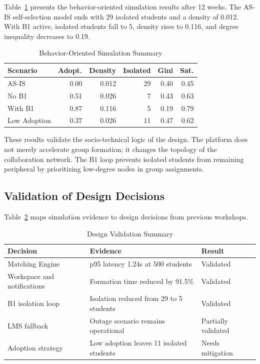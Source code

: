 \documentclass[conference]{IEEEtran}
\begin{document}
Table~\ref{tab:behavior} presents the behavior-oriented simulation results after 12 weeks. The AS-IS self-selection model ends with 29 isolated students and a density of 0.012. With B1 active, isolated students fall to 5, density rises to 0.116, and degree inequality decreases to 0.19.

\begin{table}[htbp]
\caption{Behavior-Oriented Simulation Summary}
\label{tab:behavior}
\centering
\begin{tabular}{lrrrrr}
\toprule
\textbf{Scenario} & \textbf{Adopt.} & \textbf{Density} & \textbf{Isolated} & \textbf{Gini} & \textbf{Sat.} \\
\midrule
AS-IS & 0.00 & 0.012 & 29 & 0.40 & 0.45 \\
No B1 & 0.51 & 0.026 & 7 & 0.43 & 0.63 \\
With B1 & 0.87 & 0.116 & 5 & 0.19 & 0.79 \\
Low Adoption & 0.37 & 0.026 & 11 & 0.47 & 0.62 \\
\bottomrule
\end{tabular}
\end{table}

These results validate the socio-technical logic of the design. The platform does not merely accelerate group formation; it changes the topology of the collaboration network. The B1 loop prevents isolated students from remaining peripheral by prioritizing low-degree nodes in group assignments.

\subsection{Validation of Design Decisions}

Table~\ref{tab:validation} maps simulation evidence to design decisions from previous workshops.

\begin{table}[htbp]
\caption{Design Validation Summary}
\label{tab:validation}
\centering
\begin{tabular}{p{2.2cm} p{3.4cm} p{1.2cm}}
\toprule
\textbf{Decision} & \textbf{Evidence} & \textbf{Result} \\
\midrule
Matching Engine & p95 latency 1.24s at 500 students & Validated \\
Workspace and notifications & Formation time reduced by 91.5\% & Validated \\
B1 isolation loop & Isolation reduced from 29 to 5 students & Validated \\
LMS fallback & Outage scenario remains operational & Partially validated \\
Adoption strategy & Low adoption leaves 11 isolated students & Needs mitigation \\
\bottomrule
\end{tabular}
\end{table}
\end{document}
